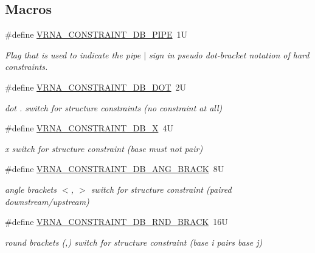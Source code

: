 \subsection*{Macros}
\begin{DoxyCompactItemize}
\item 
\#define \hyperlink{group__constraints_ga13053547a2de5532b64b64d35e097ae1}{V\+R\+N\+A\+\_\+\+C\+O\+N\+S\+T\+R\+A\+I\+N\+T\+\_\+\+D\+B\+\_\+\+P\+I\+P\+E}~1\+U
\begin{DoxyCompactList}\small\item\em Flag that is used to indicate the pipe \textquotesingle{}$\vert$\textquotesingle{} sign in pseudo dot-\/bracket notation of hard constraints. \end{DoxyCompactList}\item 
\#define \hyperlink{group__constraints_ga369bea82eae75fbe626f409fa425747e}{V\+R\+N\+A\+\_\+\+C\+O\+N\+S\+T\+R\+A\+I\+N\+T\+\_\+\+D\+B\+\_\+\+D\+O\+T}~2\+U
\begin{DoxyCompactList}\small\item\em dot \textquotesingle{}.\textquotesingle{} switch for structure constraints (no constraint at all) \end{DoxyCompactList}\item 
\#define \hyperlink{group__constraints_ga7283bbe0f8954f7b030ecc3f2d1932b2}{V\+R\+N\+A\+\_\+\+C\+O\+N\+S\+T\+R\+A\+I\+N\+T\+\_\+\+D\+B\+\_\+\+X}~4\+U
\begin{DoxyCompactList}\small\item\em \textquotesingle{}x\textquotesingle{} switch for structure constraint (base must not pair) \end{DoxyCompactList}\item 
\#define \hyperlink{group__constraints_gad54c1315a47d55653dcaa5de6e544b77}{V\+R\+N\+A\+\_\+\+C\+O\+N\+S\+T\+R\+A\+I\+N\+T\+\_\+\+D\+B\+\_\+\+A\+N\+G\+\_\+\+B\+R\+A\+C\+K}~8\+U
\begin{DoxyCompactList}\small\item\em angle brackets \textquotesingle{}$<$\textquotesingle{}, \textquotesingle{}$>$\textquotesingle{} switch for structure constraint (paired downstream/upstream) \end{DoxyCompactList}\item 
\#define \hyperlink{group__constraints_gac17b034852c914bc5879954c65d7e74b}{V\+R\+N\+A\+\_\+\+C\+O\+N\+S\+T\+R\+A\+I\+N\+T\+\_\+\+D\+B\+\_\+\+R\+N\+D\+\_\+\+B\+R\+A\+C\+K}~16\+U
\begin{DoxyCompactList}\small\item\em round brackets \textquotesingle{}(\textquotesingle{},\textquotesingle{})\textquotesingle{} switch for structure constraint (base i pairs base j) \end{DoxyCompactList}\item 

\end{DoxyCompactItemize}
